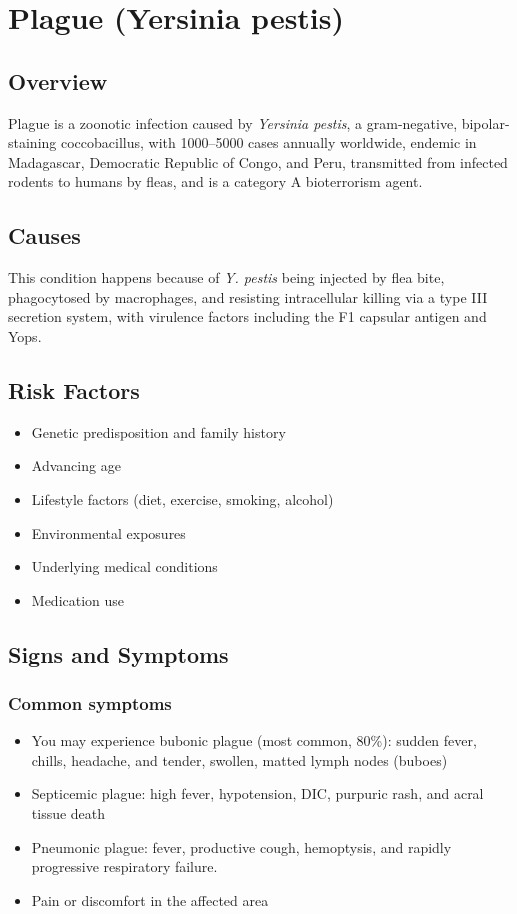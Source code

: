 \chapter{Plague (Yersinia pestis)}
\label{sec:Plague}

\section{Overview}
Plague is a zoonotic infection caused by \textit{Yersinia pestis}, a gram-negative, bipolar-staining coccobacillus, with 1000--5000 cases annually worldwide, endemic in Madagascar, Democratic Republic of Congo, and Peru, transmitted from infected rodents to humans by fleas, and is a category A bioterrorism agent.
\section{Causes}
This condition happens because of \textit{Y. pestis} being injected by flea bite, phagocytosed by macrophages, and resisting intracellular killing via a type III secretion system, with virulence factors including the F1 capsular antigen and Yops.     
\section{Risk Factors}

\begin{itemize}[noitemsep]
  \item Genetic predisposition and family history
  \item Advancing age
  \item Lifestyle factors (diet, exercise, smoking, alcohol)
  \item Environmental exposures
  \item Underlying medical conditions
  \item Medication use
\end{itemize}
\section{Signs and Symptoms}

\subsection{Common symptoms}
\begin{itemize}[noitemsep]
  \item You may experience bubonic plague (most common, 80\%): sudden fever, chills, headache, and tender, swollen, matted lymph nodes (buboes)
  \item Septicemic plague: high fever, hypotension, DIC, purpuric rash, and acral tissue death
  \item Pneumonic plague: fever, productive cough, hemoptysis, and rapidly progressive respiratory failure.
  \item Pain or discomfort in the affected area
  \end{itemize}

